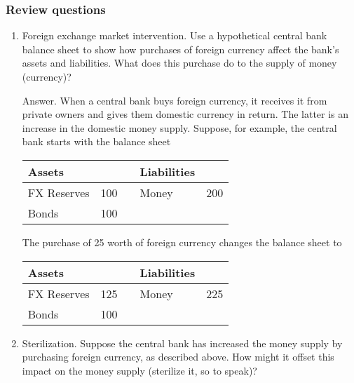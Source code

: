 \documentclass[letterpaper,12pt]{article}
\begin{document}
\subsubsection*{Review questions}

\begin{enumerate}

\item Foreign exchange market intervention.
Use a hypothetical central bank balance sheet to show how
purchases of foreign currency affect the bank's assets and liabilities. What does this purchase do to the supply of money (currency)?

Answer.  When a central bank buys foreign currency,
it receives it from private owners and gives them
    domestic currency in return.
    The latter is an increase in the domestic money supply.
    Suppose, for example, the central bank
    starts with the balance sheet
\begin{center}
\begin{tabular}{lrclr}
               Assets  &     &&     Liabilities                     \\
               \hline
               FX Reserves &  100 &&     Money  &  200   \\
               Bonds   & 100 && \\
\end{tabular}
\end{center}
%
The purchase of 25 worth of foreign currency
changes the balance sheet to
%
\begin{center}
\begin{tabular}{lrclr}
               Assets  &     &&     Liabilities                     \\
               \hline
               FX Reserves &  125 &&     Money  &  225   \\
               Bonds   & 100 && \\
\end{tabular}
\end{center}
%

\item Sterilization.  Suppose the central bank has increased the money supply by purchasing foreign currency, as described above.
    How might it offset this impact on the money supply (sterilize it, so to speak)?


\end{enumerate}
\end{document}

